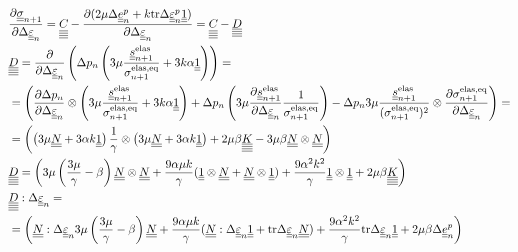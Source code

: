 \documentclass[12pt]{article}
\begin{document}
\begin{appendices}
    \begin{align}
        & \frac{\partial\uusigman}{\partial \Deltaeps} = \uuuuC{} - \frac{\partial (2\mu\Deltaep + k\mtr\Deltaepsp\uuUnit)}{\partial\Deltaeps} = \uuuuC{} - \uuuuD \\
        & \uuuuD =  \frac{\partial }{\partial \Deltaeps} \left( \Delta p_n \left( 3\mu \frac{\uusnelas}{\sigmaeqnelas} + 3k\alpha \uuUnit  \right) \right) = \\
        & = \left( \frac{\partial\Delta p_n}{\partial\Deltaeps} \otimes \left( 3\mu\frac{\uusnelas}{\sigmaeqnelas} + 3k\alpha \uuUnit \right) + \Delta p_n \left(3\mu\frac{\partial\uusnelas}{\partial\Deltaeps}\frac{1}{\sigmaeqnelas} \right) - \Delta p_n 3\mu\frac{\uusnelas}{(\sigmaeqnelas)^2} \otimes \frac{\partial\sigmaeqnelas}{\partial\Deltaeps}\right) = \\
        & = \left( \left( 3\mu \uuN + 3\alpha k \uuUnit \right) \frac{1}{\gamma} \otimes \left( 3\mu \uuN + 3\alpha k \uuUnit \right) + 2\mu\beta\uuuuK - 3\mu\beta\uuN \otimes \uuN \right) \\
        & \uuuuD = \left( 3\mu\left(\frac{3\mu}{\gamma} - \beta\right)\uuN \otimes \uuN + \frac{9\alpha\mu k}{\gamma} (\uuUnit \otimes \uuN + \uuN \otimes \uuUnit) + \frac{9\alpha^2k^2}{\gamma} \uuUnit \otimes \uuUnit + 2\mu\beta \uuuuK \right) \\
        & \uuuuD : \Deltaeps = \\
        & = \left( \uuN : \Deltaeps 3\mu \left( \frac{3\mu}{\gamma} - \beta \right) \uuN + \frac{9\alpha\mu k}{\gamma} (\uuN : \Deltaeps \uuUnit + \mtr\Deltaeps \uuN) + \frac{9\alpha^2k^2}{\gamma} \mtr \Deltaeps \uuUnit + 2\mu\beta \Deltaep \right)  \\
    \end{align}
\end{appendices}
\end{document}
